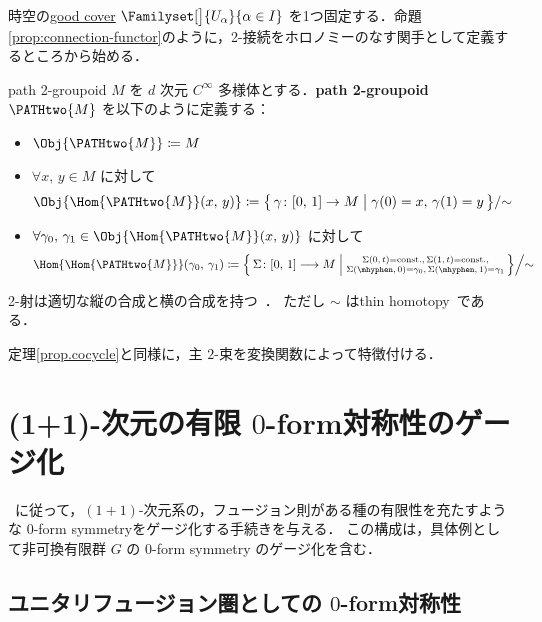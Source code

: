 \documentclass[TQFT_main]{subfiles}
\begin{document}
時空の\hyperref[def:good-cover]{good cover} $\Familyset[\big]{U_\alpha}{\alpha \in I}$ を1つ固定する．命題\ref{prop:connection-functor}のように，2-接続をホロノミーのなす関手として定義するところから始める．

\begin{mydef}[label=def:path2grpd]{path 2-groupoid}
    $M$ を $d$ 次元 $C^\infty$ 多様体とする．\textbf{path 2-groupoid} $\PATHtwo{M}$ を以下のように定義する：
    \begin{itemize}
        \item $\Obj{\PATHtwo{M}} \coloneqq M$
        \item $\forall x,\, y \in M$ に対して
        \begin{align}
            \Obj{\Hom{\PATHtwo{M}}(x,\, y)} \coloneqq \bigl\{\, \gamma \colon [0,\, 1] \to M \bigm| \gamma(0) = x,\, \gamma(1) = y \,\bigr\} /{\sim}
        \end{align}
        \item $\forall \gamma_0,\, \gamma_1 \in \Obj{\Hom{\PATHtwo{M}}(x,\, y)}$ に対して
        \begin{align}
            \Hom{\Hom{\PATHtwo{M}}} (\gamma_0,\, \gamma_1) \coloneqq \Bigl\{\, \Sigma \colon [0,\, 1] \lto M \Bigm| \substack{\Sigma(0,\, t) = \mathrm{const.},\, \Sigma(1,\, t) = \mathrm{const.}, \\ \Sigma (\mhyphen,\, 0) = \gamma_0,\, \Sigma (\mhyphen,\, 1) = \gamma_1 }\,\Bigr\} \Big{/} {\sim}
        \end{align}
    \end{itemize}
    2-射は適切な縦の合成と横の合成を持つ~\cite[Definition20, p.20]{BaezSchreiber2004HGT1}．
    ただし $\sim$ はthin homotopy~\cite[Definition19, p.20]{BaezSchreiber2004HGT1}である．
\end{mydef}

定理\ref{prop.cocycle}と同様に，主 $2$-束を変換関数によって特徴付ける．

\section{(1+1)-次元の有限 $0$-form対称性のゲージ化}

~\cite{BhardwajTachikawa2017gauging2d}に従って，$(1+1)$-次元系の，フュージョン則がある種の有限性を充たすような $0$-form symmetryをゲージ化する手続きを与える．
この構成は，具体例として非可換有限群 $G$ の $0$-form symmetry のゲージ化を含む．

\subsection{ユニタリフュージョン圏としての $0$-form対称性}
\end{document}
